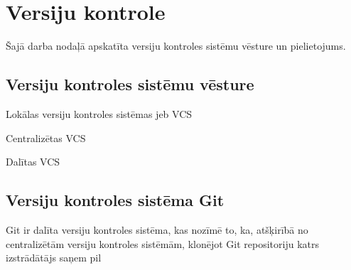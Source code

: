 \chapter{Versiju kontrole}


Šajā darba nodaļā apskatīta versiju kontroles sistēmu vēsture un pielietojums.

\section{Versiju kontroles sistēmu vēsture}
Lokālas versiju kontroles sistēmas jeb VCS

Centralizētas VCS

Dalītas VCS


\section{Versiju kontroles sistēma Git}
Git ir dalīta versiju kontroles sistēma, kas nozīmē to, ka, atšķirībā no centralizētām versiju kontroles sistēmām, klonējot Git repositoriju katrs izstrādātājs saņem pil
